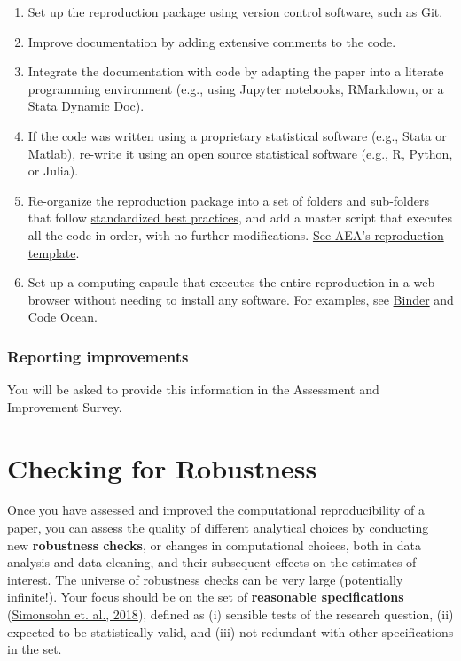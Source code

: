 \documentclass[]{book}
\providecommand{\tightlist}{%
  \setlength{\itemsep}{0pt}\setlength{\parskip}{0pt}}
\begin{document}
\begin{enumerate}
\def\labelenumi{\arabic{enumi}.}
\tightlist
\item
  Set up the reproduction package using version control software, such as Git.
\item
  Improve documentation by adding extensive comments to the code.
\item
  Integrate the documentation with code by adapting the paper into a literate programming environment (e.g., using Jupyter notebooks, RMarkdown, or a Stata Dynamic Doc).
\item
  If the code was written using a proprietary statistical software (e.g., Stata or Matlab), re-write it using an open source statistical software (e.g., R, Python, or Julia).
\item
  Re-organize the reproduction package into a set of folders and sub-folders that follow \href{https://www.projecttier.org/tier-protocol/specifications/\#overview-of-the-documentation}{standardized best practices}, and add a master script that executes all the code in order, with no further modifications. \href{https://github.com/AEADataEditor/replication-template}{See AEA's reproduction template}.\\
\item
  Set up a computing capsule that executes the entire reproduction in a web browser without needing to install any software. For examples, see \href{https://mybinder.org/}{Binder} and \href{https://codeocean.com/}{Code Ocean}.
\end{enumerate}

\hypertarget{reporting-improvements}{%
\subsection{Reporting improvements}\label{reporting-improvements}}

You will be asked to provide this information in the Assessment and Improvement Survey.

\hypertarget{robust}{%
\chapter{Checking for Robustness}\label{robust}}

Once you have assessed and improved the computational reproducibility of a paper, you can assess the quality of different analytical choices by conducting new \textbf{robustness checks}, or changes in computational choices, both in data analysis and data cleaning, and their subsequent effects on the estimates of interest. The universe of robustness checks can be very large (potentially infinite!). Your focus should be on the set of \textbf{reasonable specifications} (\href{https://urisohn.com/sohn_files/wp/wordpress/wp-content/uploads/Paper-Specification-curve-2018-11-02.pdf}{Simonsohn et. al., 2018}), defined as (i) sensible tests of the research question, (ii) expected to be statistically valid, and (iii) not redundant with other specifications in the set.
\end{document}
